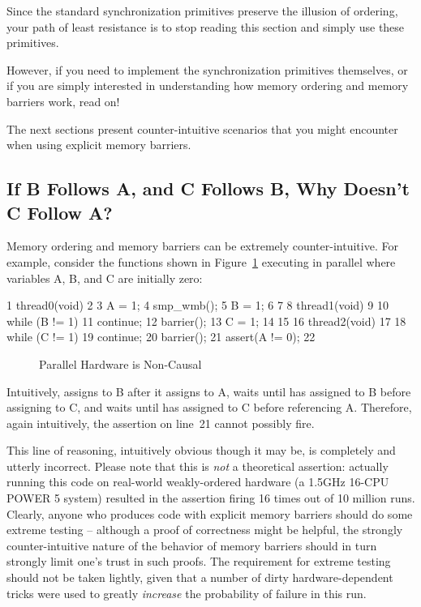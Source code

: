 Since the standard synchronization primitives preserve the illusion of
ordering, your path of least resistance is to stop reading
this section and simply use these primitives.

However, if you need to implement the synchronization primitives
themselves, or if you are simply interested in understanding how memory
ordering and memory barriers work, read on!

The next sections present counter-intuitive scenarios that you might
encounter when using explicit memory barriers.

\subsection{If B Follows A, and C Follows B, Why Doesn't C Follow A?}
\label{sec:advsync:If B Follows A, and C Follows B, Why Doesn't C Follow A?}

Memory ordering and memory barriers can be extremely counter-intuitive.
For example, consider the functions shown in
Figure~\ref{fig:advsync:Parallel Hardware is Non-Causal}
executing in parallel
where variables A, B, and C are initially zero:

{ \scriptsize
\begin{verbbox}
  1 thread0(void)
  2 {
  3   A = 1;
  4   smp_wmb();
  5   B = 1;
  6 }
  7
  8 thread1(void)
  9 {
 10   while (B != 1)
 11     continue;
 12   barrier();
 13   C = 1;
 14 }
 15
 16 thread2(void)
 17 {
 18   while (C != 1)
 19     continue;
 20   barrier();
 21   assert(A != 0);
 22 }
\end{verbbox}
}
\begin{figure}[htbp]
\centering
\theverbbox
\caption{Parallel Hardware is Non-Causal}
\label{fig:advsync:Parallel Hardware is Non-Causal}
\end{figure}

Intuitively,  assigns to B after it assigns to A,
 waits until  has assigned to B before
assigning to C, and  waits until  has
assigned to C before referencing A.
Therefore, again intuitively, the assertion on line~21 cannot possibly
fire.

This line of reasoning, intuitively obvious though it may be, is completely
and utterly incorrect.
Please note that this is \emph{not} a theoretical assertion:
actually running this code on real-world weakly-ordered hardware
(a 1.5GHz 16-CPU POWER 5 system) resulted in the assertion firing
16 times out of 10 million runs.
Clearly, anyone who produces code with explicit memory barriers
should do some extreme testing -- although a proof of correctness might
be helpful, the strongly counter-intuitive nature of the behavior of
memory barriers should in turn strongly limit one's trust in such proofs.
The requirement for extreme testing should not be taken lightly, given
that a number of dirty hardware-dependent tricks were used to
greatly \emph{increase} the probability of failure in this run.

